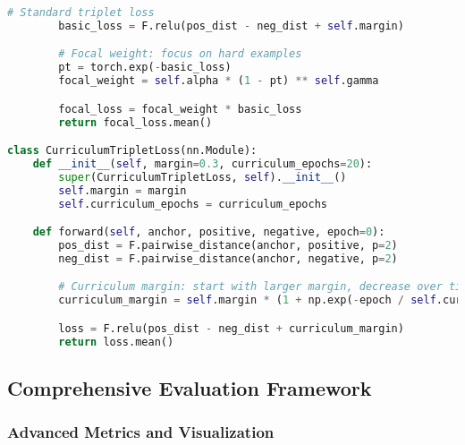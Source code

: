 \begin{lstlisting}[language=Python, caption=Advanced Triplet Mining Implementation]
        # Standard triplet loss
        basic_loss = F.relu(pos_dist - neg_dist + self.margin)

        # Focal weight: focus on hard examples
        pt = torch.exp(-basic_loss)
        focal_weight = self.alpha * (1 - pt) ** self.gamma

        focal_loss = focal_weight * basic_loss
        return focal_loss.mean()

class CurriculumTripletLoss(nn.Module):
    def __init__(self, margin=0.3, curriculum_epochs=20):
        super(CurriculumTripletLoss, self).__init__()
        self.margin = margin
        self.curriculum_epochs = curriculum_epochs

    def forward(self, anchor, positive, negative, epoch=0):
        pos_dist = F.pairwise_distance(anchor, positive, p=2)
        neg_dist = F.pairwise_distance(anchor, negative, p=2)

        # Curriculum margin: start with larger margin, decrease over time
        curriculum_margin = self.margin * (1 + np.exp(-epoch / self.curriculum_epochs))

        loss = F.relu(pos_dist - neg_dist + curriculum_margin)
        return loss.mean()
\end{lstlisting}

\subsection{Comprehensive Evaluation Framework}

\subsubsection{Advanced Metrics and Visualization}

